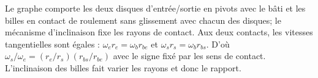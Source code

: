 \begin{corrigebox}
Le graphe comporte les deux disques d'entrée/sortie en pivots avec le
                bâti et les billes en contact de roulement sans glissement avec chacun des
                disques; le mécanisme d'inclinaison fixe les rayons de contact.
Aux deux contacts, les vitesses tangentielles sont égales :
                $\omega_e r_e=\omega_b r_{be}$ et
                $\omega_s r_s=\omega_b r_{bs}$. D'où
                $\boxed{\omega_s/\omega_e=(r_e/r_s)(r_{bs}/r_{be})}$ avec le signe fixé par
                les sens de contact. L'inclinaison des billes fait varier les rayons et
                donc le rapport.
\end{corrigebox}
